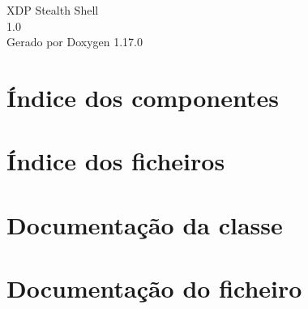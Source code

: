 \documentclass[twoside]{book}
\newcommand{\+}{\discretionary{\mbox{\scriptsize$\hookleftarrow$}}{}{}}
\newcommand{\clearemptydoublepage}{%
    \newpage{\pagestyle{empty}\cleardoublepage}%
  }
\begin{document}
  \raggedbottom
    \hypersetup{pageanchor=false,
                bookmarksnumbered=true,
                pdfencoding=unicode
               }
  \begin{titlepage}
  \vspace*{7cm}
  \begin{center}%
  {\Large XDP Stealth Shell}\\
  [1ex]\large 1.\+0 \\
  \vspace*{1cm}
  {\large Gerado por Doxygen 1.17.0}\\
  \end{center}
  \end{titlepage}
  \clearemptydoublepage
  \tableofcontents
  \clearemptydoublepage
  \hypersetup{pageanchor=true}

\chapter{Índice dos componentes}

\chapter{Índice dos ficheiros}

\chapter{Documentação da classe}



\chapter{Documentação do ficheiro}








  \backmatter
  \newpage
  \clearemptydoublepage
  \printindex
\end{document}
